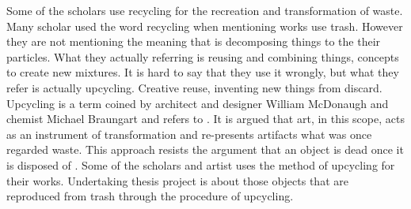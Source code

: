 Some of the scholars use recycling \citep{cerny1996recycled,herman1998trashformations} for the recreation and transformation of waste. Many scholar used the word recycling when mentioning works use trash. However they are not mentioning the meaning that is decomposing things to the their particles. What they actually referring is reusing and combining things, concepts to create new mixtures. It is hard to say that they use it wrongly, but what they refer is actually upcycling. Creative reuse, inventing new things from discard. Upcycling is a term coined by architect and designer William McDonaugh and chemist Michael Braungart and refers to  \citep[as cited in][63]{emgin2012trashion}. It is argued that art, in this scope, acts as an instrument of transformation and re-presents artifacts what was once regarded waste. This approach resists the argument that an object is dead once it is disposed of \citep{emgin2012trashion}. Some of the scholars and artist uses the method of upcycling for their works. Undertaking thesis project is about those objects that are reproduced from trash through the procedure of upcycling.
